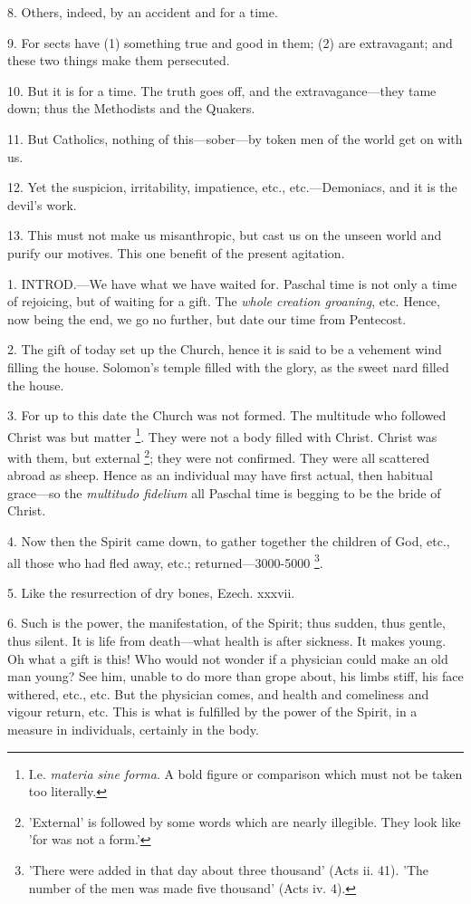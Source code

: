 8. Others, indeed, by an accident and for a time.

9. For sects have (1) something true and good in
them; (2) are extravagant; and these two things make them persecuted.

10. But it is for a time. The truth goes off, and
the extravagance—they tame down; thus the Methodists and the
Quakers.

11. But Catholics, nothing of this—sober—by
token men of the world get on with us.

12. Yet the suspicion, irritability, impatience,
etc., etc.—Demoniacs, and it is the devil's work.

13. This must not make us misanthropic, but cast
us on the unseen world and purify our motives. This one benefit of the
present agitation.


1. INTROD.—We
have what we have waited for. Paschal time is not only a time of
rejoicing, but of waiting for a gift. The \emph{whole creation groaning},
etc. Hence, now being the end, we go no further, but date our time
from Pentecost.

2. The gift of today set up the Church, hence it
is said to be a vehement wind filling the house. Solomon's temple
filled with the glory, as the sweet nard filled the house.

3. For up to this date the Church was not formed.
The multitude who followed Christ was but matter \footnote{I.e. \emph{materia sine
forma}. A bold figure or comparison which must not be taken too
literally.}. They were not a body filled with Christ. Christ was with
them, but external \footnote{'External' is followed
by some words which are nearly illegible. They look like 'for was not
a form.'};
they were not confirmed. They were all scattered abroad as sheep.
Hence as an individual may have first actual, then habitual grace—so
the \emph{multitudo fidelium} all Paschal time is begging to be the
bride of Christ.

4. Now then the Spirit came down, to gather
together the children of God, etc., all those who had fled away, etc.;
returned—3000-5000 \footnote{'There were added in
that day about three thousand' (Acts ii. 41). 'The number of the men
was made five thousand' (Acts iv. 4).}.

5. Like the resurrection of dry bones, Ezech.
xxxvii.

6. Such is the power, the manifestation, of the
Spirit; thus sudden, thus gentle, thus silent. It is life from
death—what health is after sickness. It makes young. Oh what a gift
is this! Who would not wonder if a physician could make an old
man young? See him, unable to do more than grope about, his limbs
stiff, his face withered, etc., etc. But the physician comes, and
health and comeliness and vigour return, etc. This is what is
fulfilled by the power of the Spirit, in a measure in individuals,
certainly in the body.

